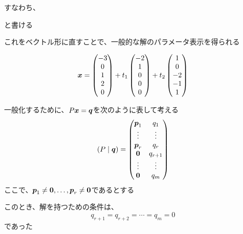 \documentclass[../../../topic_linear-algebra]{subfiles}
\begin{document}
すなわち、

\begin{center}
\end{center}

と書ける

\br

これをベクトル形に直すことで、一般的な解のパラメータ表示を得られる

\begin{equation*}
  \vb*{x} = \begin{pmatrix}
    -3 \\
    0  \\
    1  \\
    2  \\
    0
  \end{pmatrix} + t_1 \begin{pmatrix}
    -2 \\
    1  \\
    0  \\
    0  \\
    0
  \end{pmatrix} + t_2 \begin{pmatrix}
    1  \\
    0  \\
    -2 \\
    -1 \\
    1
  \end{pmatrix}
\end{equation*}

\sectionline
{}

一般化するために、$P\vb*{x} = \vb*{q}$を次のように表して考える
\begin{equation*}
  (P \mid \vb*{q}) = \begin{pmatrix}
    \vb*{p}_1 & q_1     \\
    \vdots    & \vdots  \\
    \vb*{p}_r & q_r     \\
    \vb*{0}   & q_{r+1} \\
    \vdots    & \vdots  \\
    \vb*{0}   & q_m
  \end{pmatrix}
\end{equation*}
ここで、$\vb*{p}_1 \neq \vb*{0}, \dots, \vb*{p}_r \neq \vb*{0}$であるとする

\br

このとき、解を持つための条件は、
\begin{equation*}
  q_{r+1} = q_{r+2} = \cdots = q_m = 0
\end{equation*}
であった
\end{document}
